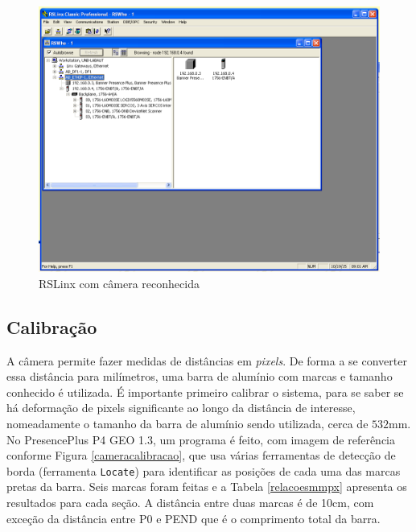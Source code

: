 \begin{figure}[!ht]
\centering
\includegraphics[width=\linewidth]{figs/resultados/camera/cameralinx}
\caption{RSLinx com câmera reconhecida \label{linxcamera}}
\end{figure}

\subsection{Calibração}

A câmera permite fazer medidas de distâncias em \textit{pixels}. De forma a se converter essa distância para milímetros, uma barra de alumínio com marcas e tamanho conhecido é utilizada. É importante primeiro calibrar o sistema, para se saber se há deformação de pixels significante ao longo da distância de interesse, nomeadamente o tamanho da barra de alumínio sendo utilizada, cerca de $532$mm. No PresencePlus P4 GEO 1.3, um programa é feito, com imagem de referência conforme Figura \ref{cameracalibracao}, que usa várias ferramentas de detecção de borda (ferramenta \texttt{Locate}) para identificar as posições de cada uma das marcas pretas da barra. Seis marcas foram feitas e a Tabela \ref{relacoesmmpx} apresenta os resultados para cada seção. A distância entre duas marcas é de 10cm, com exceção da distância entre P0 e PEND que é o comprimento total da barra.

